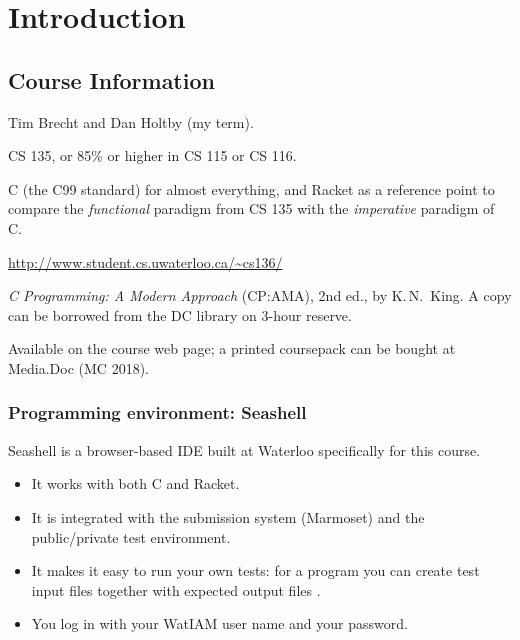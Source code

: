 \chapter{Introduction}

\section{Course Information}

\begin{description}[leftmargin=!,labelwidth=3.6cm]
  \item[Instructors] Tim Brecht and Dan Holtby (my term).
  \item[Prerequisites] CS 135, or 85\% or higher in CS 115 or CS 116.
  \item[Languages] C (the C99 standard) for almost everything, and Racket as a
    reference point to compare the \emph{functional} paradigm from CS 135 with the
    \emph{imperative} paradigm of C.
  \item[Web page] \url{http://www.student.cs.uwaterloo.ca/~cs136/}
  \item[Textbook] \emph{C Programming: A Modern Approach} (CP:AMA), 2nd ed., by
    K.\,N.~King. A copy can be borrowed from the DC library on 3-hour reserve.
  \item[Course notes] Available on the course web page; a printed coursepack can be bought
    at Media.Doc (MC 2018).
\end{description}

\subsection{Programming environment: Seashell}

Seashell is a browser-based IDE built at Waterloo specifically for this course.
\begin{itemize}
  \item It works with both C and Racket.
  \item It is integrated with the submission system (Marmoset) and the public/private
    test environment.
  \item It makes it easy to run your own tests: for a program  you can create
    test input files  together with expected output files .
  \item You log in with your WatIAM user name and your 
    password.
\end{itemize}

